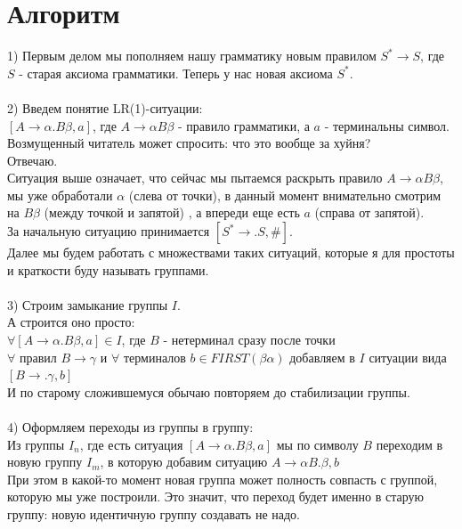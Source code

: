 \documentclass[14pt]{extreport}
\begin{document}
	\section{Алгоритм}
	1) Первым делом мы пополняем нашу грамматику новым правилом $S^* \to S$, где $S$ -
	старая аксиома грамматики. Теперь у нас новая аксиома $S^*$.\\\\
	2) Введем понятие LR(1)-ситуации:\\
	$[A \to \alpha . B\beta , a]$, где $A \to \alpha B \beta$ - правило грамматики, а $a$ -
	терминальны символ.\\
	Возмущенный читатель может спросить: что это вообще за хуйня?\\
	Отвечаю.\\
	Ситуация выше означает, что сейчас мы пытаемся раскрыть правило $A \to \alpha B \beta$,
	мы уже обработали $\alpha$ (слева от точки), в данный момент внимательно смотрим на 
	$B\beta$ (между точкой и запятой) , а впереди еще есть $a$ (справа от запятой).\\
	За начальную ситуацию принимается $[S^* \to .S,\#]$.\\
	Далее мы будем работать с множествами таких ситуаций, которые я для простоты и краткости
	буду называть группами.\\\\
	3) Строим замыкание группы $I$.\\
	А строится оно просто:\\
	$\forall [A \to \alpha . B \beta , a] \in I$, где $B$ - нетерминал сразу после точки\\
	$\forall $ правил $B \to \gamma$ и $\forall$ терминалов $b \in FIRST(\beta \alpha)$
	добавляем в $I$ ситуации вида\\
	$[B \to . \gamma , b]$\\
	И по старому сложившемуся обычаю повторяем до стабилизации группы.\\\\
	4) Оформляем переходы из группы в группу:\\
	Из группы $I_n$, где есть ситуация $[A \to \alpha . B \beta , a]$ мы по символу $B$
	переходим в новую группу $I_m$, в которую добавим ситуацию $A \to \alpha B . \beta , b$\\
	При этом в какой-то момент новая группа может полность совпасть с группой, которую мы
	уже построили. Это значит, что переход будет именно в старую группу: новую идентичную
	группу создавать не надо.\\\\
\end{document}
